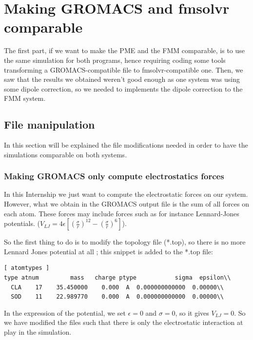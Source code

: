 \documentclass[12pt,twoside,a4paper]{report}
\begin{document}
\section{Making GROMACS and fmsolvr comparable}	

The first part, if we want to make the PME and the FMM comparable, is to use the same simulation for both programs, hence requiring coding some tools transforming a GROMACS-compatible file to fmsolvr-compatible one. Then, we saw that the results we obtained weren't good enough as one system was using some dipole correction, so we needed to implements the dipole correction to the FMM system.

\subsection{File manipulation}

In this section will be explained the file modifications needed in order to have the simulations comparable on both systems.

\subsubsection{Making GROMACS only compute electrostatics forces}

In this Internship we just want to compute the electrostatic forces on our system. However, what we obtain in the GROMACS output file is the sum of all forces on each atom. These forces may include forces such as for instance Lennard-Jones potentials.
($V_{LJ} = 4\epsilon [(\frac{\sigma}{r})^12 - (\frac{\sigma}{r})^6] $). 

So the first thing to do is to modify the topology file (*.top), so there is no more Lennard Jones potential at all ; this snippet is added to the *.top file:


\begin{verbatim}
[ atomtypes ]
type atnum         mass   charge ptype           sigma  epsilon\\
  CLA    17    35.450000    0.000  A  0.000000000000  0.00000\\
  SOD    11    22.989770    0.000  A  0.000000000000  0.00000\\

\end{verbatim}


In the expression of the potential, we set $\epsilon = 0$ and $\sigma = 0$, so it gives $V_{LJ} = 0$. So we have modified the files such that there is only the electrostatic interaction at play in the simulation.
\end{document}
